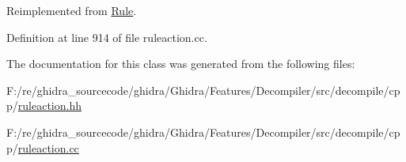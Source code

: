 Reimplemented from \mbox{\hyperlink{class_rule_a4023bfc7825de0ab866790551856d10e}{Rule}}.



Definition at line 914 of file ruleaction.\+cc.



The documentation for this class was generated from the following files\+:\begin{DoxyCompactItemize}
\item 
F\+:/re/ghidra\+\_\+sourcecode/ghidra/\+Ghidra/\+Features/\+Decompiler/src/decompile/cpp/\mbox{\hyperlink{ruleaction_8hh}{ruleaction.\+hh}}\item 
F\+:/re/ghidra\+\_\+sourcecode/ghidra/\+Ghidra/\+Features/\+Decompiler/src/decompile/cpp/\mbox{\hyperlink{ruleaction_8cc}{ruleaction.\+cc}}\end{DoxyCompactItemize}
